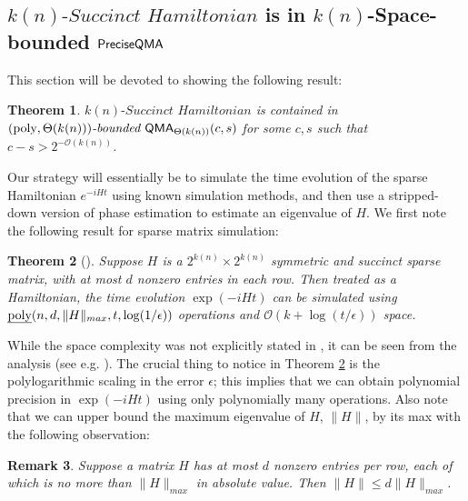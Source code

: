 \documentclass[11pt]{article}
\newtheorem{theorem}{Theorem}
\newtheorem{remark}[theorem]{Remark}
\theoremstyle{definition}
\theoremstyle{remark}
\theoremstyle{definition}
\newcommand\QMA{{\sf{QMA}}}
\newcommand\QMAexp{{\sf{PreciseQMA}}}
\newcommand\bddQMA[5]{{\left(#1,#2\right)}\textit{-bounded }\QMA_{#3}(#4,#5)}
\newcommand\spechamiltonian[1]{#1\textit{-Succinct Hamiltonian}}
\newcommand\bigoh{\mathcal{O}}
\newcommand{\poly}{\textrm{poly}}
\begin{document}
\subsection{$\spechamiltonian{k(n)}$ is in $k(n)$-Space-bounded $\QMAexp$}\label{subsec:specham-in-bddqma}
This section will be devoted to showing the following result:
\begin{theorem} \label{lem:qma protocol}
$\spechamiltonian{k(n)}$ is contained in $\bddQMA{\poly}{\Theta(k(n))}{\Theta(k(n))}{c}{s}$ for some $c,s$ such that $c - s > 2^{-\mathcal{O}(k(n))}$.
\end{theorem}
Our strategy will essentially be to simulate the time evolution of the sparse Hamiltonian $e^{-iHt}$ using known simulation methods, and then use a stripped-down version of phase estimation to estimate an eigenvalue of $H$. We first note the following result for sparse matrix simulation:
\begin{theorem}[\cite{berry14,bccks15,berry15}] \label{thm:ham_sim}
Suppose $H$ is a $2^{k(n)} \times 2^{k(n)}$ symmetric and succinct sparse matrix, with at most $d$ nonzero entries in each row. Then treated as a Hamiltonian, the time evolution $\exp(-iHt)$ can be simulated using $\text{\emph{poly}}(n,d,\|H\|_{max}, t, \log(1/\epsilon))$ operations and $\bigoh(k+\log(t/\epsilon))$ space.
\end{theorem}
While the space complexity was not explicitly stated in \cite{berry14,bccks15,berry15}, it can be seen from the analysis (see e.g. \cite{bccks15}). The crucial thing to notice in Theorem \ref{thm:ham_sim} is the polylogarithmic scaling in the error $\epsilon$; this implies that we can obtain polynomial precision in $\exp(-iHt)$ using only polynomially many operations. Also note that we can upper bound the maximum eigenvalue of $H$, $\|H\|$, by its max with the following observation:
\begin{remark}
Suppose a matrix $H$ has at most $d$ nonzero entries per row, each of which is no more than $\|H\|_{max}$ in absolute value. Then $\| H \| \le d\|H\|_{max}$.
\end{remark}
\end{document}
